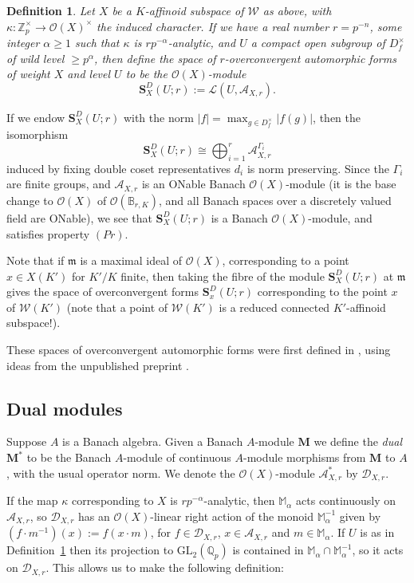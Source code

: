 \documentclass[a4paper, notitlepage]{amsart}
\newcommand{\Z}{\ensuremath{\mathbb{Z}}\xspace}
\newcommand{\m}{\ensuremath{\mathfrak{m}}\xspace}
\newcommand{\OO}{\ensuremath{\mathscr{O}}\xspace}
\newtheorem{definition}[theorem]{Definition}
\begin{document}
\begin{definition} \label{ocformdef}Let $X$ be a $K$-affinoid subspace of $\mathscr{W}$ as above, with $\kappa:\Z_p^\times \rightarrow \OO(X)^\times$ the induced character. If we have a real number $r=p^{-n}$, some integer $\alpha \ge 1$ such that $\kappa$ is $rp^{-\alpha}$-analytic, and $U$ a compact open subgroup of $D_f^\times$ of wild level $\geq p^{\alpha}$, then define the space of $r$-overconvergent automorphic forms of weight $X$ and level $U$ to be the $\OO(X)$-module
$$\mathbf{S}^D_{X}(U;r):=\mathscr{L}(U,\mathscr{A}_{X,r}).$$ 
\end{definition}

If we endow $\mathbf{S}^D_{X}(U;r)$ with the norm $|f|=\max_{g\in D_f^\times}|f(g)|$, then the isomorphism \begin{equation}\mathbf{S}^D_{X}(U;r)\cong \bigoplus_{i=1}^r \mathscr{A}_{X,r}^{\Gamma_i}\label{iso}\end{equation} induced by fixing double coset representatives $d_i$ is norm preserving. Since the $\Gamma_i$ are finite groups, and $\mathscr{A}_{X,r}$ is an ONable Banach $\OO(X)$-module (it is the base change to $\OO(X)$ of $\OO(\mathbb{B}_{r,K})$, and all Banach spaces over a discretely valued field are ONable), we see that $\mathbf{S}^D_{X}(U;r)$ is a Banach $\OO(X)$-module, and satisfies property $(Pr)$.

Note that if $\m$ is a maximal ideal of $\OO(X)$, corresponding to a point $x \in X(K')$ for $K'/K$ finite, then taking the fibre of the module $\mathbf{S}^D_{X}(U;r)$ at $\m$ gives the space of overconvergent forms $\mathbf{S}^D_{x}(U;r)$ corresponding to the point $x$ of $\mathscr{W}(K')$ (note that a point of $\mathscr{W}(K')$ is a reduced connected $K'$-affinoid subspace!).

These spaces of overconvergent automorphic forms were first defined in \cite{Bu1}, using ideas from the unpublished preprint \cite{St}.

\subsection{Dual modules}
Suppose $A$ is a Banach algebra. Given a Banach $A$-module $\mathbf{M}$ we define the \emph{dual} $\mathbf{M}^*$ to be the Banach $A$-module of continuous $A$-module morphisms from $\mathbf{M}$ to $A$, with the usual operator norm. We denote the $\OO(X)$-module $\mathscr{A}_{X,r}^*$ by $\mathscr{D}_{X,r}$.

If the map $\kappa$ corresponding to $X$ is $rp^{-\alpha}$-analytic, then $\mathbb{M}_\alpha$ acts continuously on $\mathscr{A}_{X,r}$, so $\mathscr{D}_{X,r}$ has an $\OO(X)$-linear right action of the monoid $\mathbb{M}_\alpha^{-1}$ given by $(f\cdot m^{-1})(x):=f(x\cdot m)$, for $f\in \mathscr{D}_{X,r}$, $x \in \mathscr{A}_{X,r}$ and $m \in \mathbb{M}_\alpha$. If $U$ is as in Definition~\ref{ocformdef} then its projection to $\mathrm{GL}_2(\mathbb{Q}_p)$ is contained in $\mathbb{M}_\alpha \cap \mathbb{M}_\alpha^{-1}$, so it acts on  $\mathscr{D}_{X,r}$. This allows us to make the following definition:
\end{document}

